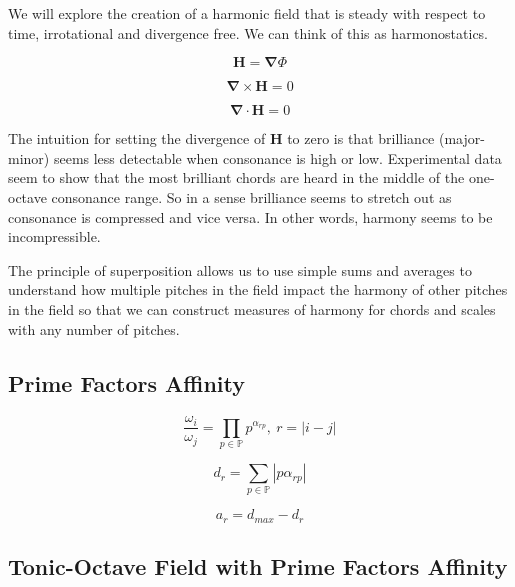 \documentclass[sn-mathphys]{sn-jnl}%
\begin{document}
We will explore the creation of a harmonic field that is steady with respect to time, irrotational and divergence free. We can think of this as harmonostatics. 

\begin{equation}
  \boldsymbol{H} = \boldsymbol{\nabla}\Phi\label{gradPhiEq}
\end{equation}

\begin{equation}
  \boldsymbol{\nabla \times H}=0\label{harmonyCurlStaticsEq}
\end{equation}

\begin{equation}
  \boldsymbol{\nabla \cdot H}=0\label{harmonyFieldStaticsEq}
\end{equation}

The intuition for setting the divergence of $\mathbf{H}$ to zero is that brilliance (major-minor) seems less detectable when consonance is high or low. Experimental data seem to show that the most brilliant chords are heard in the middle of the one-octave consonance range. So in a sense brilliance seems to stretch out as consonance is compressed and vice versa. In other words, harmony seems to be incompressible.

The principle of superposition allows us to use simple sums and averages to understand how multiple pitches in the field impact the harmony of other pitches in the field so that we can construct measures of harmony for chords and scales with any number of pitches.

\subsection{Prime Factors Affinity}

\begin{equation}
  \frac{\omega_{i}}{\omega_{j}} = \prod_{p \in \mathbb{P}} p^{\alpha_{rp}}, \ r=|i-j|
\end{equation}

\begin{equation}
  d_r = \sum_{p \in \mathbb{P}} \left| p \alpha_{rp} \right|
\end{equation}

\begin{equation}
  a_r = d_{max} - d_r
\end{equation}

\subsection{Tonic-Octave Field  with Prime Factors Affinity}
\end{document}
